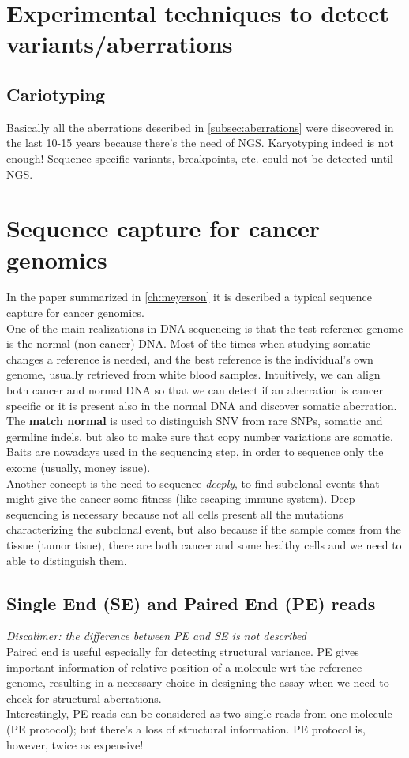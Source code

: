 \section{Experimental techniques to detect variants/aberrations}
\subsection{Cariotyping}
Basically all the aberrations described in \ref{subsec:aberrations} were discovered in the last 10-15 years because there's the need of NGS.
Karyotyping indeed is not enough!
Sequence specific variants, breakpoints, etc. could not be detected until NGS.

\section{Sequence capture for cancer genomics}
In the paper summarized in \ref{ch:meyerson} it is described a typical sequence capture for cancer genomics. \\
One of the main realizations in DNA sequencing is that the test reference genome is the normal (non-cancer) DNA.
Most of the times when studying somatic changes a reference is needed, and the best reference is the individual's own genome, usually retrieved from white blood samples.
Intuitively, we can align both cancer and normal DNA so that we can detect if an aberration is cancer specific or it is present also in the normal DNA and discover somatic aberration.
The \textbf{match normal} is used to distinguish SNV from rare SNPs, somatic and germline indels, but also to make sure that copy number variations are somatic.
Baits are nowadays used in the sequencing step, in order to sequence only the exome (usually, money issue). \\

Another concept is the need to sequence \textit{deeply}, to find subclonal events that might give the cancer some fitness (like escaping immune system). Deep sequencing is necessary because not all cells present all the mutations characterizing the subclonal event, but also because if the sample comes from the tissue (tumor tisue), there are both cancer and some healthy cells and we need to able to distinguish them.


\subsection{Single End (SE) and Paired End (PE) reads} \label{SE_PE}
\textit{Discalimer: the difference between PE and SE is not described}\\
Paired end is useful especially for detecting structural variance. PE gives important information of relative position of a molecule wrt the reference genome, resulting in a necessary choice in designing the assay when we need to check for structural aberrations. \\
Interestingly, PE reads can be considered as two single reads from one molecule (PE protocol); but there's a loss of structural information.
PE protocol is, however, twice as expensive!

